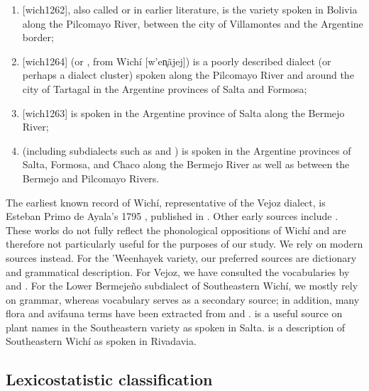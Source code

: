 \begin{enumerate}
    \item {} [wich1262], also called  or  in earlier literature, is the variety spoken in Bolivia along the Pilcomayo River, between the city of Villamontes and the Argentine border;
    \item {} [wich1264] (or , from Wichí  [w’en̥ã\-jej])  is a poorly described dialect (or perhaps a dialect cluster) spoken along the Pilcomayo River and around the city of Tartagal in the Argentine provinces of Salta and Formosa;
    \item {} [wich1263] is spoken in the Argentine province of Salta along the Bermejo River;
    \item {} (including subdialects such as  and ) is spoken in the Argentine provinces of Salta, Formosa, and Chaco along the Bermejo River as well as between the Bermejo and Pilcomayo Rivers.
\end{enumerate}

The earliest known record of Wichí, representative of the Vejoz dialect, is Esteban Primo de Ayala's 1795 , published in \citet{IC-RM-20}. Other early sources include \citet{GP86,GP97,IM95,JR96,RLN10,RJH13a,RJH13b,RJH37,RJH40}. These works do not fully reflect the phonological oppositions of Wichí and are therefore not particularly useful for the purposes of our study. We rely on modern sources instead. For the ’Weenhayek variety, our preferred sources are  dictionary and  grammatical description. For Vejoz, we have consulted the vocabularies by \citet{VU74} and \citet{MG-MELO15}. For the Lower Bermejeño subdialect of Southeastern Wichí, we mostly rely on  grammar, whereas  vocabulary serves as a secondary source; in addition, many flora and avifauna terms have been extracted from \citet{CS08} and \citet{CS-FL-PR-VN13}. \citet{MS14} is a useful source on plant names in the Southeastern variety as spoken in Salta. \citet{JT09-th} is a description of Southeastern Wichí as spoken in Rivadavia.

\subsection{Lexicostatistic classification} \label{intro-lexicostat}


